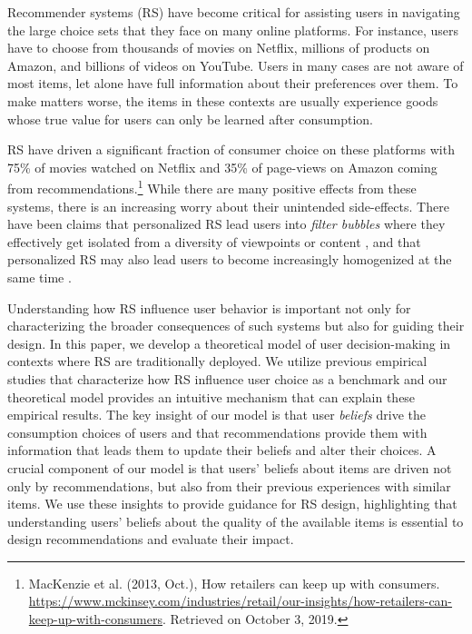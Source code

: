 \documentclass[manuscript, nonacm]{acmart}
\begin{document}
Recommender systems (RS) have become critical for assisting users in navigating the large choice sets that they face on many online platforms. For instance, users have to choose from thousands of movies on Netflix, millions of products on Amazon, and billions of videos on YouTube. Users in many cases are not aware of most items, let alone have full information about their preferences over them. To make matters worse, the items in these contexts are usually experience goods whose true value for users can only be learned after consumption.
\par

RS have driven a significant fraction of consumer choice on these platforms with 75\% of movies watched on Netflix and 35\% of page-views on Amazon coming from recommendations.\footnote{MacKenzie et al. (2013, Oct.),  How retailers can keep up with consumers. \url{https://www.mckinsey.com/industries/retail/our-insights/how-retailers-can-keep-up-with-consumers}. Retrieved on October 3, 2019.} While there are many positive effects from these systems, there is an increasing worry about their unintended side-effects. There have been claims that personalized RS lead users into \textit{filter bubbles} where they effectively get isolated from a diversity of viewpoints or content \cite{pariser2011filter}, and that personalized RS may also lead users to become increasingly homogenized at the same time \cite{chaney2018algorithmic, hosanagar2013will}.
\par
Understanding how RS influence user behavior is important not only for characterizing the broader consequences of such systems but also for guiding their design. In this paper, we develop a theoretical model of user decision-making in contexts where RS are traditionally deployed. We utilize previous empirical studies that characterize how RS influence user choice as a benchmark and our theoretical model provides an intuitive mechanism that can explain these empirical results. The key insight of our model is that user \textit{beliefs} drive the consumption choices of users and that recommendations provide them with information that leads them to update their beliefs and alter their choices. A crucial component of our model is that users' beliefs about items are driven not only by recommendations, but also from their previous experiences with similar items. We use these insights to provide guidance for RS design, highlighting that understanding users' beliefs about the quality of the available items is essential to design recommendations and evaluate their impact.
\end{document}
